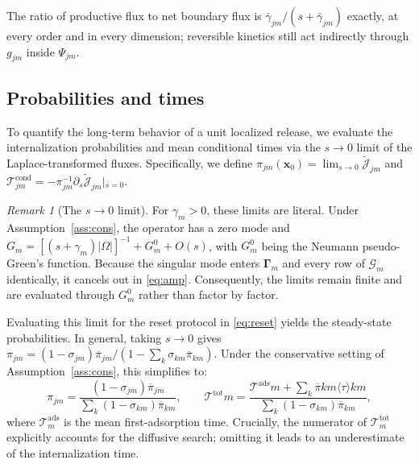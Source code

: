 \documentclass[pdflatex,sn-mathphys-num]{sn-jnl}
\numberwithin{equation}{section}
\theoremstyle{thmstyleone}%
\theoremstyle{definition}
\theoremstyle{remark}
\newtheorem{remark}[theorem]{Remark}
\begin{document}
The ratio of productive flux to net boundary flux is $\bar\gamma_{jm}/(s+\bar\gamma_{jm})$ exactly, at every order and in every dimension; reversible kinetics still act indirectly through $g_{jm}$ inside $\Psi_{jm}$.

\subsection{Probabilities and times}
\label{subsec:times}
To quantify the long-term behavior of a unit localized release, we evaluate the internalization probabilities and mean conditional times via the $s\to0$ limit of the Laplace-transformed fluxes. Specifically, we define $\pi_{jm}(\mathbf x_0)=\lim_{s\to0}\widetilde{\mathcal J}_{jm}$ and $\mathcal T^{\mathrm{cond}}_{jm}=-\pi_{jm}^{-1}\partial_s\widetilde{\mathcal J}_{jm}\vert{}_{s=0}$.

\begin{remark}[The $s\to0$ limit]\label{rem:pseudo}
For $\gamma_m>0$, these limits are literal. Under Assumption~\ref{ass:cons}, the operator has a zero mode and $G_m=[(s+\gamma_m)\vert{}\Omega\vert{}]^{-1}+G^0_m+O(s)$, with $G^0_m$ being the Neumann pseudo-Green's function. Because the singular mode enters $\bm\Gamma_m$ and every row of $\bm{\mathcal G}_m$ identically, it cancels out in \eqref{eq:amp}. Consequently, the limits remain finite and are evaluated through $G^0_m$ rather than factor by factor.
\end{remark}

Evaluating this limit for the reset protocol in \eqref{eq:reset} yields the steady-state probabilities. In general, taking $s\to0$ gives $\pi_{jm}=(1-\sigma_{jm})\overline\pi_{jm}/(1-\sum_k\sigma_{km}\overline\pi_{km})$. Under the conservative setting of Assumption~\ref{ass:cons}, this simplifies to:
\begin{equation}
\pi_{jm}=\frac{(1-\sigma_{jm})\overline\pi_{jm}}{\sum_k(1-\sigma_{km})\overline\pi_{km}},
\qquad
\mathcal T^{\mathrm{tot}}m=\frac{\mathcal T^{\mathrm{ads}}m
+\sum_k\overline\pi{km}\langle\tau\rangle{km}}{\sum_k(1-\sigma_{km})\overline\pi_{km}},
\label{eq:renewalpi}
\end{equation}
where $\mathcal T^{\mathrm{ads}}_m$ is the mean first-adsorption time. Crucially, the numerator of $\mathcal T^{\mathrm{tot}}_m$ explicitly accounts for the diffusive search; omitting it leads to an underestimate of the internalization time.
\end{document}
